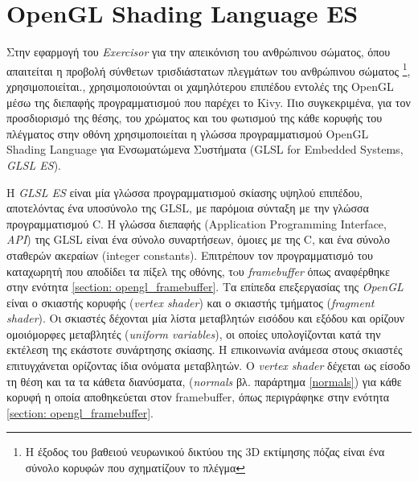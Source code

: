 
\section{OpenGL Shading Language ES}
\label{section:opengl_shading_language}

Στην εφαρμογή του \textsl{Exercisor} για την απεικόνιση του ανθρώπινου σώματος, όπου απαιτείται η προβολή σύνθετων τρισδιάστατων πλεγμάτων του ανθρώπινου σώματος \footnote{Η έξοδος του βαθειού νευρωνικού δικτύου της 3D εκτίμησης πόζας είναι ένα σύνολο κορυφών που σχηματίζουν το πλέγμα}, χρησιμοποιείται., χρησιμοποιούνται οι χαμηλότερου επιπέδου εντολές της OpenGL μέσω της διεπαφής προγραμματισμού που παρέχει το Kivy. Πιο συγκεκριμένα, για τον προσδιορισμό της θέσης, του χρώματος και του φωτισμού της κάθε κορυφής του πλέγματος στην οθόνη χρησιμοποιείται η γλώσσα προγραμματισμού OpenGL Shading Language για Ενσωματώμενα Συστήματα (GLSL for Embedded Systems, \textsl{GLSL ES}).

H \textsl{GLSL ES} είναι μία γλώσσα προγραμματισμού σκίασης υψηλού επιπέδου, αποτελόντας ένα υποσύνολο της GLSL, με παρόμοια σύνταξη με την γλώσσα προγραμματισμού C. Η γλώσσα διεπαφής (Application Programming Interface, \textsl{API}) της GLSL είναι ένα σύνολο συναρτήσεων, όμοιες με της C, και ένα σύνολο σταθερών ακεραίων (integer constants). Επιτρέπουν τον προγραμματισμό του καταχωρητή που αποδίδει τα πίξελ της οθόνης, τoυ \textsl{framebuffer} όπως αναφέρθηκε στην ενότητα \ref{section: opengl_framebuffer}. Tα επίπεδα επεξεργασίας της \textsl{OpenGL} είναι ο σκιαστής κορυφής (\textsl{vertex shader}) και ο σκιαστής τμήματος (\textsl{fragment shader}). Οι σκιαστές δέχονται μία λίστα μεταβλητών εισόδου και εξόδου και ορίζουν ομοιόμορφες μεταβλητές (\textsl{uniform variables}), οι οποίες υπολογίζονται κατά την εκτέλεση της εκάστοτε συνάρτησης σκίασης. Η επικοινωνία ανάμεσα στους σκιαστές επιτυγχάνεται ορίζοντας ίδια ονόματα μεταβλητών. Ο \textsl{vertex shader} δέχεται ως είσοδο τη θέση και τα τα κάθετα διανύσματα, (\textsl{normals} βλ. παράρτημα \ref{normals}) για κάθε κορυφή η οποία αποθηκεύεται στον framebuffer, όπως περιγράφηκε στην ενότητα \ref{section: opengl_framebuffer}. 